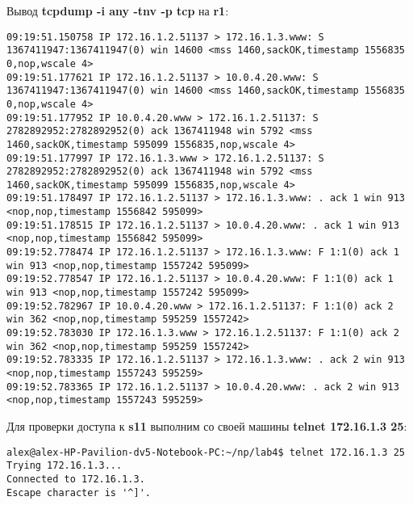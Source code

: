 \documentclass[a4paper,12pt]{article}
\begin{document}
Вывод \textbf{tcpdump -i any -tnv -p tcp} на \textbf{r1}:
\begin{Verbatim}
09:19:51.150758 IP 172.16.1.2.51137 > 172.16.1.3.www: S 1367411947:1367411947(0) win 14600 <mss 1460,sackOK,timestamp 1556835 0,nop,wscale 4>
09:19:51.177621 IP 172.16.1.2.51137 > 10.0.4.20.www: S 1367411947:1367411947(0) win 14600 <mss 1460,sackOK,timestamp 1556835 0,nop,wscale 4>
09:19:51.177952 IP 10.0.4.20.www > 172.16.1.2.51137: S 2782892952:2782892952(0) ack 1367411948 win 5792 <mss 1460,sackOK,timestamp 595099 1556835,nop,wscale 4>
09:19:51.177997 IP 172.16.1.3.www > 172.16.1.2.51137: S 2782892952:2782892952(0) ack 1367411948 win 5792 <mss 1460,sackOK,timestamp 595099 1556835,nop,wscale 4>
09:19:51.178497 IP 172.16.1.2.51137 > 172.16.1.3.www: . ack 1 win 913 <nop,nop,timestamp 1556842 595099>
09:19:51.178515 IP 172.16.1.2.51137 > 10.0.4.20.www: . ack 1 win 913 <nop,nop,timestamp 1556842 595099>
09:19:52.778474 IP 172.16.1.2.51137 > 172.16.1.3.www: F 1:1(0) ack 1 win 913 <nop,nop,timestamp 1557242 595099>
09:19:52.778547 IP 172.16.1.2.51137 > 10.0.4.20.www: F 1:1(0) ack 1 win 913 <nop,nop,timestamp 1557242 595099>
09:19:52.782967 IP 10.0.4.20.www > 172.16.1.2.51137: F 1:1(0) ack 2 win 362 <nop,nop,timestamp 595259 1557242>
09:19:52.783030 IP 172.16.1.3.www > 172.16.1.2.51137: F 1:1(0) ack 2 win 362 <nop,nop,timestamp 595259 1557242>
09:19:52.783335 IP 172.16.1.2.51137 > 172.16.1.3.www: . ack 2 win 913 <nop,nop,timestamp 1557243 595259>
09:19:52.783365 IP 172.16.1.2.51137 > 10.0.4.20.www: . ack 2 win 913 <nop,nop,timestamp 1557243 595259>
\end{Verbatim}

Для проверки доступа к \textbf{s11} выполним со своей машины
\textbf{telnet 172.16.1.3 25}:
\begin{Verbatim}
alex@alex-HP-Pavilion-dv5-Notebook-PC:~/np/lab4$ telnet 172.16.1.3 25
Trying 172.16.1.3...
Connected to 172.16.1.3.
Escape character is '^]'.
\end{Verbatim}
\end{document}
